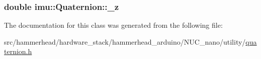 \subsubsection[{\texorpdfstring{\+\_\+z}{_z}}]{\setlength{\rightskip}{0pt plus 5cm}double imu\+::\+Quaternion\+::\+\_\+z\hspace{0.3cm}{\ttfamily [private]}}\hypertarget{classimu_1_1Quaternion_afa9fd67fbe96078b57c3e1d1a8d8f803}{}\label{classimu_1_1Quaternion_afa9fd67fbe96078b57c3e1d1a8d8f803}


The documentation for this class was generated from the following file\+:\begin{DoxyCompactItemize}
\item 
src/hammerhead/hardware\+\_\+stack/hammerhead\+\_\+arduino/\+N\+U\+C\+\_\+nano/utility/\hyperlink{quaternion_8h}{quaternion.\+h}\end{DoxyCompactItemize}
